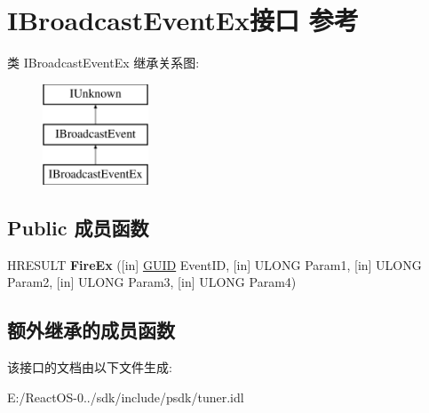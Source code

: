 \hypertarget{interface_i_broadcast_event_ex}{}\section{I\+Broadcast\+Event\+Ex接口 参考}
\label{interface_i_broadcast_event_ex}
类 I\+Broadcast\+Event\+Ex 继承关系图\+:\begin{figure}[H]
\begin{center}
\leavevmode
\includegraphics[height=3.000000cm]{interface_i_broadcast_event_ex}
\end{center}
\end{figure}
\subsection*{Public 成员函数}
\begin{DoxyCompactItemize}
\item 
\mbox{\label{interface_i_broadcast_event_ex_aaf69a886fc1b81a67d8491bf90c66122}} 
H\+R\+E\+S\+U\+LT {\bfseries Fire\+Ex} (\mbox{[}in\mbox{]} \hyperlink{interface_g_u_i_d}{G\+U\+ID} Event\+ID, \mbox{[}in\mbox{]} U\+L\+O\+NG Param1, \mbox{[}in\mbox{]} U\+L\+O\+NG Param2, \mbox{[}in\mbox{]} U\+L\+O\+NG Param3, \mbox{[}in\mbox{]} U\+L\+O\+NG Param4)
\end{DoxyCompactItemize}
\subsection*{额外继承的成员函数}


该接口的文档由以下文件生成\+:\begin{DoxyCompactItemize}
\item 
E\+:/\+React\+O\+S-\/0../sdk/include/psdk/tuner.\+idl\end{DoxyCompactItemize}
